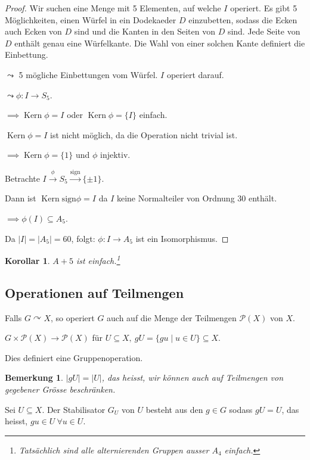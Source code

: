 \documentclass{article}
\theoremstyle{plain}
\newtheorem{corollary}{Korollar}
\newtheorem{bemerkung}{Bemerkung}
\renewcommand{\ker}{\mathop{\mathrm{Kern}}}
\newcommand{\sgn}{\mathrm{sign}}
\newcommand{\operateson}{\curvearrowright}
\begin{document}
\begin{proof}
    Wir suchen eine Menge mit 5 Elementen, auf welche $I$ operiert.
    Es gibt 5 Möglichkeiten, einen Würfel in ein Dodekaeder $D$ einzubetten, sodass die Ecken auch Ecken von $D$ sind und die Kanten in den Seiten von $D$ sind.
    Jede Seite von $D$ enthält genau eine Würfelkante.
    Die Wahl von einer solchen Kante definiert die Einbettung. 
    
    $\leadsto$ 5 mögliche Einbettungen vom Würfel. $I$ operiert darauf.

    $\leadsto \phi\colon I\to S_5$. 
    
    $\implies \ker\phi=I$ oder $\ker\phi=\{I\}$ einfach.

    $\ker\phi=I$ ist nicht möglich, da die Operation nicht trivial ist.

    $\implies \ker\phi=\{1\}$ und $\phi$ injektiv.

    Betrachte $I\xrightarrow{\phi}S_5\xrightarrow{\sgn}\{\pm1\}$.
    
    Dann ist $\ker\sgn\phi=I$ da $I$ keine Normalteiler von Ordnung 30 enthält.

    $\implies \phi(I) \subseteq A_5$.

    Da $|I|=|A_5|=60$, folgt: $\phi\colon I\to A_5$ ist ein Isomorphismus.
\end{proof}
\begin{corollary}
    $A+5$ ist einfach.\footnote{Tatsächlich sind alle alternierenden Gruppen ausser $A_4$ einfach.}
\end{corollary}

\subsection*{Operationen auf Teilmengen}
Falls $G\operateson X$, so operiert $G$ auch auf die Menge der Teilmengen $\mathcal{P}(X)$ von $X$.

$G \times \mathcal{P}(X) \to \mathcal{P}(X)$ 
für $U \subseteq X,\ gU=\{gu\mid u\in U\} \subseteq X$.

Dies definiert eine Gruppenoperation.

\begin{bemerkung}
    $|gU|=|U|$, das heisst, wir können auch auf Teilmengen von gegebener Grösse beschränken.
\end{bemerkung}

Sei $U\subseteq X$. Der Stabilisator $G_U$ von $U$ besteht aus den $g\in G$ sodass $gU=U$, das heisst, $gu\in U \ \forall u\in U$.
\end{document}
